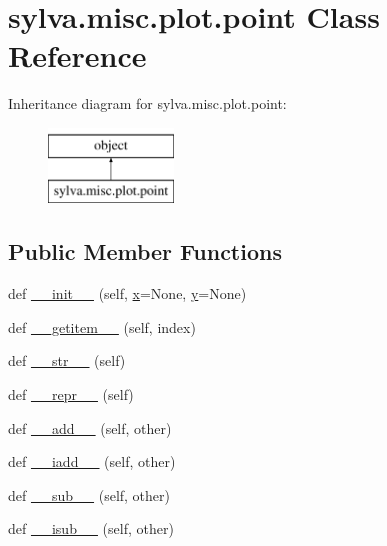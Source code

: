 \hypertarget{classsylva_1_1misc_1_1plot_1_1point}{}\section{sylva.\+misc.\+plot.\+point Class Reference}
\label{classsylva_1_1misc_1_1plot_1_1point}
Inheritance diagram for sylva.\+misc.\+plot.\+point\+:\begin{figure}[H]
\begin{center}
\leavevmode
\includegraphics[height=2.000000cm]{classsylva_1_1misc_1_1plot_1_1point}
\end{center}
\end{figure}
\subsection*{Public Member Functions}
\begin{DoxyCompactItemize}
\item 
def \hyperlink{classsylva_1_1misc_1_1plot_1_1point_a081090273abbdf33a6d4817720887cae}{\+\_\+\+\_\+init\+\_\+\+\_\+} (self, \hyperlink{classsylva_1_1misc_1_1plot_1_1point_a268ceb8acaa96e215d84447421cbadc0}{x}=None, \hyperlink{classsylva_1_1misc_1_1plot_1_1point_ac2bc4268769be52f4443f74b619cd781}{y}=None)
\item 
def \hyperlink{classsylva_1_1misc_1_1plot_1_1point_a38c8a33b3548844e6aa0be06d639dc5f}{\+\_\+\+\_\+getitem\+\_\+\+\_\+} (self, index)
\item 
def \hyperlink{classsylva_1_1misc_1_1plot_1_1point_a0dba47ef31ba24b71bddf5d2c60c104b}{\+\_\+\+\_\+str\+\_\+\+\_\+} (self)
\item 
def \hyperlink{classsylva_1_1misc_1_1plot_1_1point_ae31f3d284d92f335bf4723af06a45bea}{\+\_\+\+\_\+repr\+\_\+\+\_\+} (self)
\item 
def \hyperlink{classsylva_1_1misc_1_1plot_1_1point_abd550240b0bf5fb6fca1d4a2c9bd9db2}{\+\_\+\+\_\+add\+\_\+\+\_\+} (self, other)
\item 
def \hyperlink{classsylva_1_1misc_1_1plot_1_1point_a52992e538e21670f48a5ee5d63aafc5c}{\+\_\+\+\_\+iadd\+\_\+\+\_\+} (self, other)
\item 
def \hyperlink{classsylva_1_1misc_1_1plot_1_1point_a1670d6546eb506a535047d71dc8faaee}{\+\_\+\+\_\+sub\+\_\+\+\_\+} (self, other)
\item 
def \hyperlink{classsylva_1_1misc_1_1plot_1_1point_a0f73456638159eb552d6aef70d76ea57}{\+\_\+\+\_\+isub\+\_\+\+\_\+} (self, other)
\end{DoxyCompactItemize}

